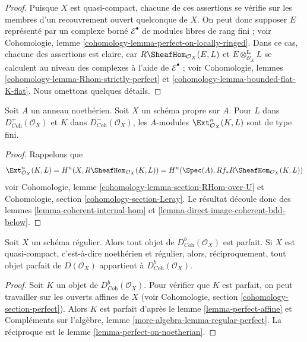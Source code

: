 \begin{proof}
Puisque $X$ est quasi-compact, chacune de ces assertions se vérifie
sur les membres d'un recouvrement ouvert quelconque de $X$.
On peut donc supposer $E$ représenté par
un complexe borné $\mathcal{E}^\bullet$ de modules libres de rang fini ; voir
Cohomologie, lemme \ref{cohomology-lemma-perfect-on-locally-ringed}.
Dans ce cas, chacune des assertions est claire, car
$R\SheafHom_{\mathcal{O}_X}(E, L)$
et $E \otimes_{\mathcal{O}_X}^\mathbf{L} L$ se calculent au
niveau des complexes à l'aide de $\mathcal{E}^\bullet$ ; voir
Cohomologie, lemmes \ref{cohomology-lemma-Rhom-strictly-perfect} et
\ref{cohomology-lemma-bounded-flat-K-flat}. Nous omettons quelques détails.
\end{proof}

\begin{lemma}
\label{lemma-ext-finite}
Soit $A$ un anneau noethérien. Soit $X$ un schéma propre sur $A$.
Pour $L$ dans
$D^+_{\textit{Coh}}(\mathcal{O}_X)$ et $K$ dans
$D^-_{\textit{Coh}}(\mathcal{O}_X)$, les $A$-modules
$\Ext_{\mathcal{O}_X}^n(K, L)$ sont de type fini.
\end{lemma}

\begin{proof}
Rappelons que
$$
\Ext_{\mathcal{O}_X}^n(K, L) =
H^n(X, R\SheafHom_{\mathcal{O}_X}(K, L)) =
H^n(\Spec(A), Rf_*R\SheafHom_{\mathcal{O}_X}(K, L))
$$
voir Cohomologie, lemme \ref{cohomology-lemma-section-RHom-over-U}
et Cohomologie, section \ref{cohomology-section-Leray}.
Le résultat découle donc des
lemmes \ref{lemma-coherent-internal-hom} et
\ref{lemma-direct-image-coherent-bdd-below}.
\end{proof}

\begin{lemma}
\label{lemma-perfect-on-regular}
Soit $X$ un schéma régulier. Alors
tout objet de $D^b_{\textit{Coh}}(\mathcal{O}_X)$ est parfait.
Si $X$ est quasi-compact, c'est-à-dire noethérien et régulier,
alors, réciproquement, tout objet parfait de
$D(\mathcal{O}_X)$ appartient à $D^b_{\textit{Coh}}(\mathcal{O}_X)$.
\end{lemma}

\begin{proof}
Soit $K$ un objet de $D^b_{\textit{Coh}}(\mathcal{O}_X)$.
Pour vérifier que $K$ est parfait, on peut travailler sur les ouverts affines de $X$
(voir Cohomologie, section \ref{cohomology-section-perfect}).
Alors $K$ est parfait d'après le lemme \ref{lemma-perfect-affine} et
Compléments sur l'algèbre, lemme \ref{more-algebra-lemma-regular-perfect}.
La réciproque est le lemme \ref{lemma-perfect-on-noetherian}.
\end{proof}



